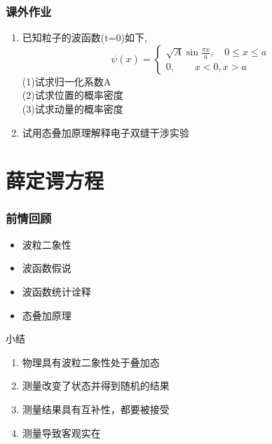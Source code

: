   \begin{frame}
     \frametitle{课外作业}
     \begin{enumerate}
        \item 已知粒子的波函数(t=0)如下,
            \[\psi(x) = \begin{cases}
              \sqrt{A}\sin \frac{\pi x}{a}, \quad 0\leq x\leq a\\
              0, \qquad  x<0, x>a
            \end{cases}\]
                (1)试求归一化系数A \\
                (2)试求位置的概率密度 \\
                (3)试求动量的概率密度
        \item 试用态叠加原理解释电子双缝干涉实验
     \end{enumerate}
 \end{frame}
 

\section{薛定谔方程}

\begin{frame}
    \frametitle{前情回顾}
    \begin{itemize}
         \item 波粒二象性
         \item 波函数假说
         \item 波函数统计诠释
         \item 态叠加原理
    \end{itemize}
\end{frame}  

\begin{frame}
    \begin{atcbox}{小结}
        ~~\\
    \begin{enumerate}
         \item 物理具有波粒二象性处于叠加态
         \item 测量改变了状态并得到随机的结果
         \item 测量结果具有互补性，都要被接受
         \item 测量导致客观实在
    \end{enumerate}
    \end{atcbox}
\end{frame}  


